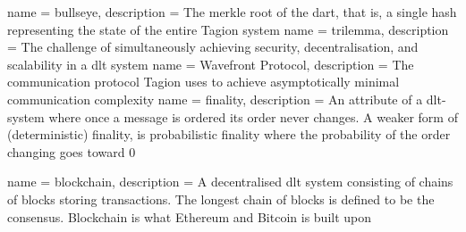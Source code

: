 

{
    name = bullseye,
    description = {The merkle root of the \gls{dart}, that is, a single hash representing the state of the entire Tagion system}
}
{
    name = trilemma,
    description = {The challenge of simultaneously achieving security, decentralisation, and scalability in a \gls{dlt} system}
}
{
    name = Wavefront Protocol,
    description = {The communication protocol Tagion uses to achieve asymptotically minimal communication complexity}
}
{
    name = finality,
    description = {An attribute of a \gls{dlt}-system where once a message is ordered its order never changes. A weaker form of (deterministic) finality, is probabilistic finality where the probability of the order changing goes toward 0}
}


{
    name = blockchain,
    description = {
        A decentralised \gls{dlt} system consisting of chains of blocks storing transactions. The longest chain of blocks is defined to be the consensus. Blockchain is what Ethereum and Bitcoin is built upon
    }
}

